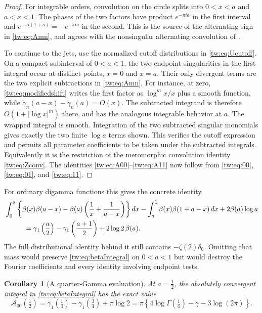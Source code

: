 \documentclass[11pt,letterpaper]{article}
\numberwithin{equation}{section}
\theoremstyle{plain}
\newtheorem{corollary}[theorem]{Corollary}
\theoremstyle{definition}
\theoremstyle{remark}
\begin{document}
\begin{proof}
For integrable orders, convolution on the circle splits into
$0<x<a$ and $a<x<1$. The phases of the two factors have product
$e^{-\pi ia}$ in the first interval and
$e^{-\pi i(1+a)}=-e^{-\pi ia}$ in the second. This is the source
of the alternating sign in \eqref{tw:eq:Amn}, and agrees with
the nonsingular alternating convolution of
\cite[Theorem~1.13]{ZhuHuKim2026}.

To continue to the jets, use the normalized cutoff distributions in
\eqref{tw:eq:Ucutoff}. On a compact subinterval of $0<a<1$, the
two endpoint singularities in the first integral occur at distinct
points, $x=0$ and $x=a$. Their only divergent terms are the two
explicit subtractions in \eqref{tw:eq:Amn}. For instance, at zero,
\eqref{tw:eq:modifiedshift} writes the first factor as
$\log^m x/x$ plus a smooth function, while
$\widetilde\gamma_n(a-x)-\widetilde\gamma_n(a)=O(x)$.
The subtracted integrand is therefore
$O(1+|\log x|^m)$ there, and has the analogous integrable behavior
at $a$. The wrapped integral is smooth. Integration of the two
subtracted singular monomials gives exactly the two finite
$\log a$ terms shown. This verifies the cutoff expression and
permits all parameter coefficients to be taken under the
subtracted integrals. Equivalently it is the restriction of the
meromorphic convolution identity \eqref{tw:eq:Zconv}. The identities
\eqref{tw:eq:A00}--\eqref{tw:eq:A11} now follow from
\eqref{tw:eq:00}, \eqref{tw:eq:01}, and \eqref{tw:eq:11}.
\end{proof}

For ordinary digamma functions this gives the concrete identity
\begin{align}
 &\int_0^a\left\{\beta(x)\beta(a-x)
               -\beta(a)\left(\frac1x+\frac1{a-x}\right)\right\}dx
       -\int_a^1\beta(x)\beta(1+a-x)\,dx
       +2\beta(a)\log a\notag\\
 &\hspace{1cm}=\gamma_1\left(\frac a2\right)
          -\gamma_1\left(\frac{a+1}{2}\right)
                         +2\log2\,\beta(a).
 \label{tw:eq:betaIntegral}
\end{align}
The full distributional identity behind it still contains
$-\zeta(2)\delta_0$. Omitting that mass would preserve
\eqref{tw:eq:betaIntegral} on $0<a<1$ but would destroy the
Fourier coefficients and every identity involving endpoint tests.

\begin{corollary}[A quarter-Gamma evaluation]
\label{tw:cor:quarterGamma}
At $a=\tfrac12$, the absolutely convergent integral in
\eqref{tw:eq:betaIntegral} has the exact value
\begin{equation}\label{tw:eq:quarterGamma}
 \mathcal A_{00}\left(\tfrac12\right)
 =\gamma_1\left(\tfrac14\right)-\gamma_1\left(\tfrac34\right)
                                      +\pi\log2
 =\pi\left\{4\log\Gamma\left(\tfrac14\right)
                          -\gamma-3\log(2\pi)\right\}.
\end{equation}
\end{corollary}
\end{document}
